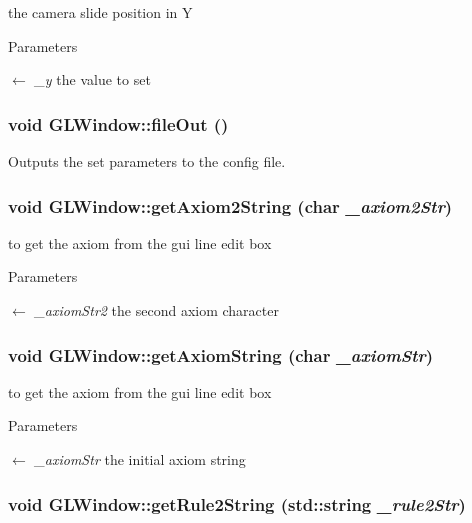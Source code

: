 the camera slide position in Y 
\begin{DoxyParams}{Parameters}
\item[\mbox{$\leftarrow$} {\em \_\-y}]the value to set \end{DoxyParams}
\hypertarget{classGLWindow_aaa661493b1dfd67faa3189e5f6cd248c}{
\subsubsection[{fileOut}]{\setlength{\rightskip}{0pt plus 5cm}void GLWindow::fileOut ()}}
\label{classGLWindow_aaa661493b1dfd67faa3189e5f6cd248c}


Outputs the set parameters to the config file. \hypertarget{classGLWindow_ad7b47965c7ad9dc0830ad66d1ecc141f}{
\subsubsection[{getAxiom2String}]{\setlength{\rightskip}{0pt plus 5cm}void GLWindow::getAxiom2String (char {\em \_\-axiom2Str})}}
\label{classGLWindow_ad7b47965c7ad9dc0830ad66d1ecc141f}


to get the axiom from the gui line edit box 
\begin{DoxyParams}{Parameters}
\item[\mbox{$\leftarrow$} {\em \_\-axiomStr2}]the second axiom character \end{DoxyParams}
\hypertarget{classGLWindow_a317631af1f77dc4e7e42ddf39d58fa9f}{
\subsubsection[{getAxiomString}]{\setlength{\rightskip}{0pt plus 5cm}void GLWindow::getAxiomString (char {\em \_\-axiomStr})}}
\label{classGLWindow_a317631af1f77dc4e7e42ddf39d58fa9f}


to get the axiom from the gui line edit box 
\begin{DoxyParams}{Parameters}
\item[\mbox{$\leftarrow$} {\em \_\-axiomStr}]the initial axiom string \end{DoxyParams}
\hypertarget{classGLWindow_a9ead24bdf6bb3331ae99e4447970cb52}{
\subsubsection[{getRule2String}]{\setlength{\rightskip}{0pt plus 5cm}void GLWindow::getRule2String (std::string {\em \_\-rule2Str})}}
\label{classGLWindow_a9ead24bdf6bb3331ae99e4447970cb52}


